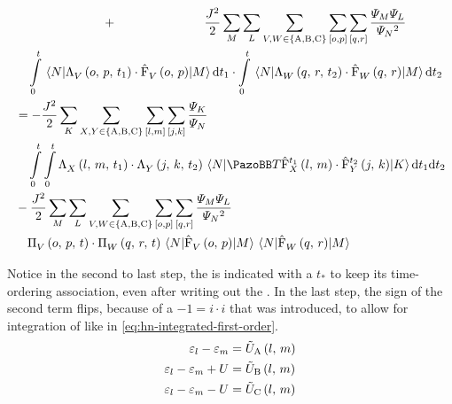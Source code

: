 \begin{equation}
\begin{split}
        &\stackrel{\phantom{\ref{eq:interaction-picture-v-ham-full}}}{+} 
        \frac{J^2}{2}
        \lsum[M]\lsum[L]\lsum[V,W \in \left\{\text{A}, \text{B}, \text{C}\right\}]
        \fullneighborsum{o}{p}\fullneighborsum{q}{r}
        \frac{\psiN[M]\psiN[L]}{\psiN{}^2}\\&\quad
        \int\limits_0^t \bracketHelper{N}{\VhamiltonianAnalyticalPart{$V$}{o}{p}{t_1} \cdot \VhamiltonianOperatorPart{$V$}{o}{p}}{M}  \mathrm{d}t_1
        \cdot
        \int\limits_0^t \bracketHelper{N}{\VhamiltonianAnalyticalPart{$W$}{q}{r}{t_2} \cdot \VhamiltonianOperatorPart{$W$}{q}{r}}{M}  \mathrm{d}t_2\\
        &=
        - \frac{J^2}{2} \lsum[K]\lsum[X,Y \in \left\{\text{A}, \text{B}, \text{C}\right\}] \fullneighborsum{l}{m}\fullneighborsum{j}{k}
        \frac{\psiN[K]}{\psiN} \\&\quad
        \int\limits_0^t \int\limits_0^t  
        \VhamiltonianAnalyticalPart{$X$}{l}{m}{t_1}
        \cdot 
        \VhamiltonianAnalyticalPart{$Y$}{j}{k}{t_2}
        \bracketHelper{N}{\timeOrderingOperator
            \VhamiltonianOperatorPart[t_1]{$X$}{l}{m}
        \cdot 
            \VhamiltonianOperatorPart[t_2]{$Y$}{j}{k}
        }{K}            \mathrm{d}t_1\mathrm{d}t_2 \\
        &-\frac{J^2}{2}
        \lsum[M]\lsum[L]\lsum[V,W \in \left\{\text{A}, \text{B}, \text{C}\right\}]
        \fullneighborsum{o}{p}\fullneighborsum{q}{r}
        \frac{\psiN[M]\psiN[L]}{\psiN{}^2}\\&\quad
        \VhamiltonianAnalyticalPartIntegrated{$V$}{o}{p}{t} 
        \cdot
        \VhamiltonianAnalyticalPartIntegrated{$W$}{q}{r}{t}
        \bracketHelper{N}{\VhamiltonianOperatorPart{$V$}{o}{p}}{M}
        \bracketHelper{N}{\VhamiltonianOperatorPart{$W$}{q}{r}}{M}
    \end{split}
\end{equation}

Notice in the second to last step, the \VhamiltonianOperatorPart[t_\ast]{$\ast$}{\ast}{\ast} is indicated with a $t_\ast$ to keep its time-ordering association, even after writing out the .
In the last step, the sign of the second term flips, because of a $-1 = i \cdot i$ that was introduced, to allow for integration of  like in \autoref{eq:hn-integrated-first-order}.\\

\begin{equation}
    \label{eq:u-eps-substitution}
    \begin{split}
        \epsl-\epsl[m] &= \ueps{A}{l}{m}\\
        \epsl-\epsl[m]+U &= \ueps{B}{l}{m}\\
        \epsl-\epsl[m]-U &= \ueps{C}{l}{m}\\
    \end{split}
\end{equation}

